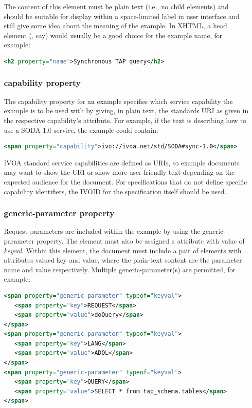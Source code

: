 \documentclass[11pt,letter]{ivoa}
\begin{document}
The content of this element must be plain text (i.e., no child
elements) and
should be suitable for display within a
space-limited label in user interface and still give some idea about the meaning
of the example.  In XHTML, a head element (, say) would usually be a good
choice for the example name, for example:

\begin{lstlisting}[language=XML]
<h2 property="name">Synchronous TAP query</h2>
\end{lstlisting}

\subsubsection{capability property}

The capability property for an example specifies which service capability the
example is to be used with by giving, in plain text, the standards URI
as given in the respective capability's  attribute.
For example, if the text is describing how to use a
SODA-1.0 service, the example could contain:

\begin{lstlisting}[language=XML]
<span property="capability">ivo://ivoa.net/std/SODA#sync-1.0</span>
\end{lstlisting}

IVOA standard service capabilities are defined as URIs,  so example documents
may want to show the URI or show more user-friendly text depending on the
expected audience for the document. For specifications that do not define
specific capability identifiers, the IVOID for the specification itself should
be used.

\subsubsection{generic-parameter property}

Request parameters are included within the example by using the
generic-parameter property. The element must also be assigned a
 attribute
with value of \emph{keyval}. Within this element, the document must include a pair of
elements with  attributes valued key and value, where the plain-text content are
the parameter name and value respectively. Multiple generic-parameter(s) are
permitted, for example:

\begin{lstlisting}[language=XML]
<span property="generic-parameter" typeof="keyval">
   <span property="key">REQUEST</span>
   <span property="value">doQuery</span>
</span>
<span property="generic-parameter" typeof="keyval">
   <span property="key">LANG</span>
   <span property="value">ADQL</span>
</span>
<span property="generic-parameter" typeof="keyval">
   <span property="key">QUERY</span>
   <span property="value">SELECT * from tap_schema.tables</span>
</span>
\end{lstlisting}
\end{document}
